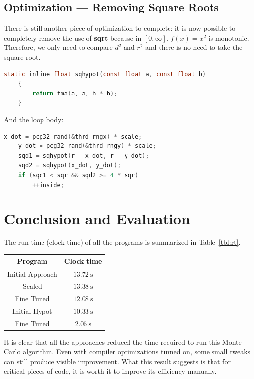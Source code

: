 \documentclass[a4paper]{article}
\begin{document}
\subsection{Optimization --- Removing Square Roots}
There is still another piece of optimization to complete: it is now possible to completely remove the use of \textbf{sqrt} because in \([0, \infty]\), \(f(x) = x^2\) is monotonic. Therefore, we only need to compare \(d^2\) and \(r^2\) and there is no need to take the square root.
\begin{lstlisting}[language=C]
    static inline float sqhypot(const float a, const float b)
    {
        return fma(a, a, b * b);
    }
\end{lstlisting}
And the loop body:
\begin{lstlisting}[language=C]
    x_dot = pcg32_rand(&thrd_rngx) * scale;
    y_dot = pcg32_rand(&thrd_rngy) * scale;
    sqd1 = sqhypot(r - x_dot, r - y_dot);
    sqd2 = sqhypot(x_dot, y_dot);
    if (sqd1 < sqr && sqd2 >= 4 * sqr)
        ++inside;
\end{lstlisting}

\section{Conclusion and Evaluation}
The run time (clock time) of all the programs is summarized in Table~\ref{tbl:rt}.
\begin{ctpt}
    \caption{Run Time (average of three)}\label{tbl:rt}
    \begin{tabular}{cc}
        \toprule
        Program & Clock time \\
        \midrule
        Initial Approach & \(\SI{13.72}{\second}\) \\
        Scaled & \(\SI{13.38}{\second}\) \\
        Fine Tuned & \(\SI{12.08}{\second}\) \\
        Initial Hypot & \(\SI{10.33}{\second}\) \\
        Fine Tuned & \(\SI{2.05}{\second}\) \\
        \bottomrule
    \end{tabular}
\end{ctpt}

It is clear that all the approaches reduced the time required to run this Monte Carlo algorithm. Even with compiler optimizations turned on, some small tweaks can still produce visible improvement. What this result suggests is that for critical pieces of code, it is worth it to improve its efficiency manually.
\end{document}
